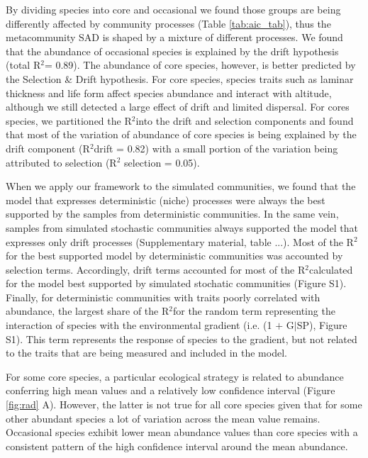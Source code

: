 \documentclass[12pt]{article}
\renewcommand{\Rsquared}{R{$^2$}} %
\begin{document}
By dividing species into core and occasional we found those groups are
being differently affected by community processes (Table
\ref{tab:aic_tab}), thus the metacommunity SAD
is shaped by a %
mixture of different processes. We found that the abundance of
occasional species is explained by the drift hypothesis (total
\Rsquared = 0.89). The abundance of core species, however, is better
predicted by the Selection \& Drift hypothesis. For core species,
species traits such as laminar thickness and life form affect species
abundance and interact with altitude, although we still detected a
large effect of drift and limited dispersal. For cores species, we
partitioned the \Rsquared into the drift and selection components and
found that most of the variation of abundance of core species is being
explained by the drift component (\Rsquared drift = 0.82) with a small
portion of the variation being attributed to selection (\Rsquared
selection = 0.05).


When we apply our framework to the simulated communities, we found
that the model that expresses deterministic (niche) processes were
always the best supported by the samples from deterministic
communities. In the same vein, samples from simulated stochastic
communities always supported the model that expresses only drift
processes (Supplementary material, table ...). Most of the \Rsquared
for the best supported model by deterministic communities was
accounted by selection terms. Accordingly, drift terms accounted for
most of the \Rsquared calculated for the model best supported by
simulated stochatic communities (Figure S1). Finally, for
deterministic communities with traits poorly correlated with
abundance, the largest share of the \Rsquared for the random term
representing the interaction of species with the environmental
gradient (i.e. (1 $+$ G$|$SP), Figure S1). This term represents the
response of species to the gradient, but not related to the traits
that are being measured and included in the model.


For some core species, a particular ecological strategy is related to
abundance conferring high mean values and a relatively low confidence
interval (Figure \ref{fig:rad} A). However, the latter is not true for
all core species given that for some other abundant species a lot of
variation across the mean value remains. Occasional species exhibit
lower mean abundance values than core species with a consistent
pattern of the high confidence interval around the mean abundance.
\end{document}
